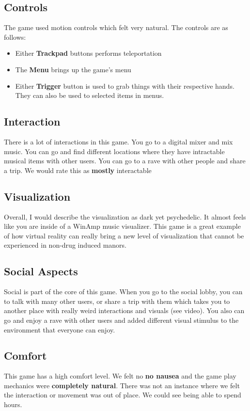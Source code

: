 \documentclass[journal]{IEEEtran}
\begin{document}
\subsection{Controls}
The game used motion controls which felt very natural. The controls are as follows: 

\begin{itemize}
	\item Either \textbf{Trackpad} buttons performs teleportation
	\item The \textbf{Menu} brings up the game's menu
	\item Either \textbf{Trigger} button is used to grab things with their respective hands. They can also be used to selected items in menus. 
\end{itemize}

\subsection{Interaction}
There is a lot of interactions in this game. You go to a digital  mixer and mix music. You can go and find different locations where they have intractable musical items with other users. You can go to a rave with other people and share a trip. We would rate this as \textbf{mostly} interactable 

\subsection{Visualization}
Overall, I would describe the visualization as dark yet psychedelic. It almost feels like you are inside of a WinAmp music visualizer. This game is a great example of how virtual reality can really bring a new level of visualization that cannot be experienced in non-drug induced manors. 
 
\subsection{Social Aspects}
Social is part of the core of this game. When you go to the social lobby, you can to talk with many other users, or share a trip with them which takes you to another place with really weird interactions and visuals (see video). You also can go and enjoy a rave with other users and added different visual stimulus to the environment that everyone can enjoy. 

\subsection{Comfort}
This game has a high comfort level. We felt no \textbf{no nausea} and the game play mechanics were \textbf{completely natural}. There was not an instance where we felt the interaction or movement was out of place. We could see being able to spend hours. 
\end{document}
